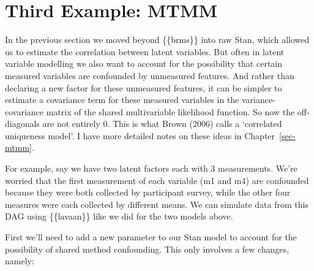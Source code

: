 \documentclass[
  letterpaper,
  DIV=11,
  numbers=noendperiod]{scrreprt}
\begin{document}
\hypertarget{third-example-mtmm}{%
\section{Third Example: MTMM}\label{third-example-mtmm}}

In the previous section we moved beyond \{\{brms\}\} into raw Stan,
which allowed us to estimate the correlation between latent variables.
But often in latent variable modelling we also want to account for the
possibility that certain measured variables are confounded by unmeasured
features. And rather than declaring a new factor for these unmeasured
features, it can be simpler to estimate a covariance term for these
measured variables in the variance-covariance matrix of the shared
multivariable likelihood function. So now the off-diagonals are not
entirely 0. This is what Brown (2006) calls a `correlated uniqueness
model'. I have more detailed notes on these ideas in
Chapter~\ref{sec-mtmm}.

For example, say we have two latent factors each with 3 measurements.
We're worried that the first measurement of each variable (m1 and m4)
are confounded because they were both collected by participant survey,
while the other four measures were each collected by different means. We
can simulate data from this DAG using \{\{lavaan\}\} like we did for the
two models above.

First we'll need to add a new parameter to our Stan model to account for
the possibility of shared method confounding. This only involves a few
changes, namely:
\end{document}
